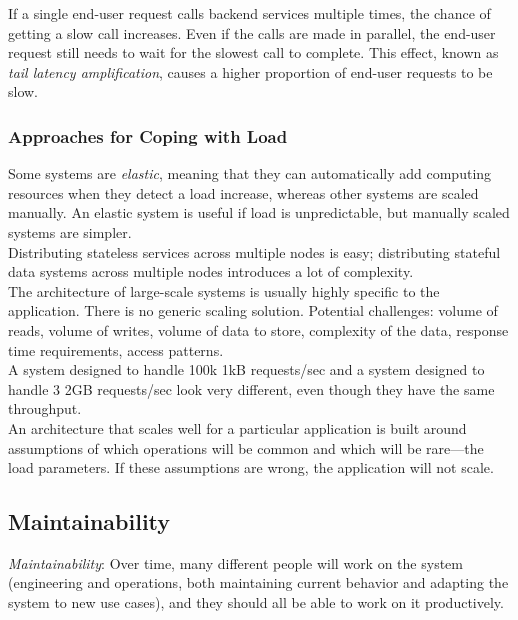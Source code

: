 \documentclass[12pt, titlepage]{article}
\begin{document}
If a single end-user request calls backend services multiple times, the chance of getting a slow call increases. Even if the calls are made in parallel, the end-user request still needs to wait for the slowest call to complete. This effect, known as \textit{tail latency amplification}, causes a higher proportion of end-user requests to be slow.

\subsubsection{Approaches for Coping with Load}

Some systems are \textit{elastic}, meaning that they can automatically add computing resources when they detect a load increase, whereas other systems are scaled manually. An elastic system is useful if load is unpredictable, but manually scaled systems are simpler. \\

Distributing stateless services across multiple nodes is easy; distributing stateful data systems across multiple nodes introduces a lot of complexity. \\

The architecture of large-scale systems is usually highly specific to the application. There is no generic scaling solution. Potential challenges: volume of reads, volume of writes, volume of data to store, complexity of the data, response time requirements, access patterns. \\

A system designed to handle 100k 1kB requests/sec and a system designed to handle 3 2GB requests/sec look very different, even though they have the same throughput. \\

An architecture that scales well for a particular application is built around assumptions of which operations will be common and which will be rare---the load parameters. If these assumptions are wrong, the application will not scale.

\subsection{Maintainability}

\textit{Maintainability}: Over time, many different people will work on the system (engineering and operations, both maintaining current behavior and adapting the system to new use cases), and they should all be able to work on it productively.
\end{document}
